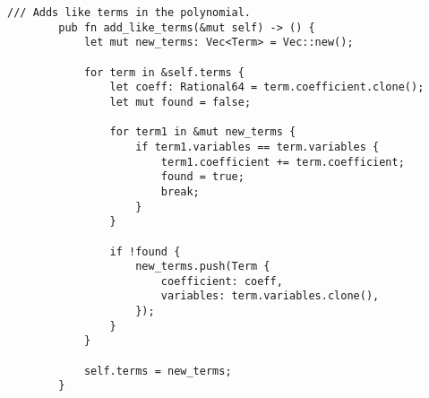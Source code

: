     \begin{lstlisting}[caption={The implementation of the \texttt{add\_like\_terms()} method for the \texttt{Polynomial} struct}, label={lst:polynomial-add-like-terms}]
        /// Adds like terms in the polynomial.
        pub fn add_like_terms(&mut self) -> () {
            let mut new_terms: Vec<Term> = Vec::new();

            for term in &self.terms {
                let coeff: Rational64 = term.coefficient.clone();
                let mut found = false;

                for term1 in &mut new_terms {
                    if term1.variables == term.variables {
                        term1.coefficient += term.coefficient;
                        found = true;
                        break;
                    }
                }

                if !found {
                    new_terms.push(Term {
                        coefficient: coeff,
                        variables: term.variables.clone(),
                    });
                }
            }

            self.terms = new_terms;
        }
    \end{lstlisting}

